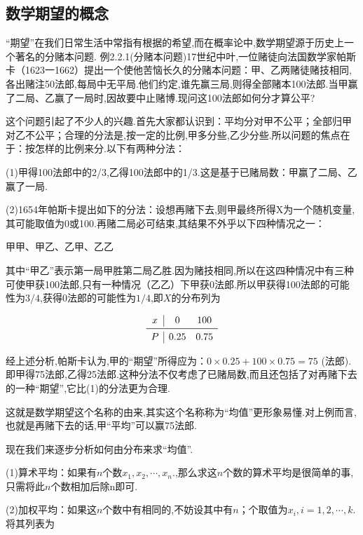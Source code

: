 \subsection{数学期望的概念}

“期望”在我们日常生活中常指有根据的希望,而在概率论中,数学期望源于历史上一个著名的分赌本问题.
例2.2.1(分赌本问题)17世纪中叶,一位赌徒向法国数学家帕斯卡（1623一1662）提出一个使他苦恼长久的分赌本问题：甲、乙两赌徒赌技相同,各出赌注50法郎,每局中无平局.他们约定,谁先赢三局,则得全部赌本100法郎.当甲赢了二局、乙赢了一局时,因故要中止赌博.现问这100法郎如何分才算公平?

这个问题引起了不少人的兴趣.首先大家都认识到：平均分对甲不公平；全部归甲对乙不公平；合理的分法是,按一定的比例,甲多分些,乙少分些.所以问题的焦点在于：按怎样的比例来分.以下有两种分法：

(1)甲得100法郎中的2/3,乙得100法郎中的1/3.这是基于已赌局数：甲赢了二局、乙赢了一局.

(2)1654年帕斯卡提出如下的分法：设想再赌下去,则甲最终所得X为一个随机变量,其可能取值为0或100.再赌二局必可结束,其结果不外乎以下四种情况之一：

\begin{center}
	甲甲、甲乙、乙甲、乙乙
\end{center}

其中“甲乙”表示第一局甲胜第二局乙胜.因为赌技相同,所以在这四种情况中有三种可使甲获100法郎,只有一种情况（乙乙）下甲获0法郎.所以甲获得100法郎的可能性为$ 3/4 $,获得0法郎的可能性为$ 1/4 $,即$ X $的分布列为

\[
\begin{array}{c|cc}{x} & {0} & {100} \\ \midrule
P & {0.25} & {0.75} \\
\end{array}
\]

经上述分析,帕斯卡认为,甲的“期望”所得应为：$0 \times 0.25+100 \times 0.75=75$
(法郎).即甲得75法郎,乙得25法郎.这种分法不仅考虑了已赌局数,而且还包括了对再赌下去的一种“期望”,它比(1)的分法更为合理.

这就是数学期望这个名称的由来,其实这个名称称为“均值”更形象易懂.对上例而言,也就是再赌下去的话,甲“平均”可以赢75法郎.

现在我们来逐步分析如何由分布来求“均值”.

(1)算术平均：如果有$ n $个数$x_{1}, x_{2}, \cdots, x_{n}$.,那么求这$ n $个数的算术平均是很简单的事,只需将此$ n $个数相加后除n即可.

(2)加权平均：如果这$ n $个数中有相同的,不妨设其中有$ n $；个取值为$x_{i}, i=1,2, \cdots, k$.将其列表为

